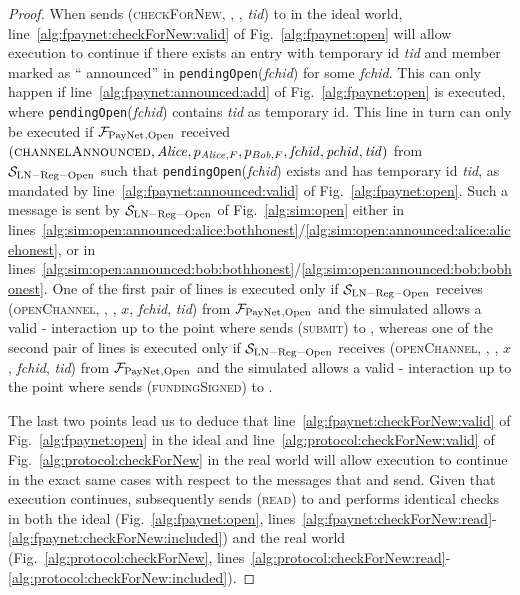 \begin{proof}
  When \environment{} sends (\textsc{checkForNew}, \alice, \bob, \textit{tid}) to
  \alice{} in the ideal world, line~\ref{alg:fpaynet:checkForNew:valid} of
  Fig.~\ref{alg:fpaynet:open} will allow execution to continue if there exists
  an entry with temporary id \textit{tid} and member \alice{} marked as
  ``\alice{} announced'' in \texttt{pendingOpen}(\textit{fchid}) for some
  \textit{fchid}. This can only happen if line~\ref{alg:fpaynet:announced:add}
  of Fig.~\ref{alg:fpaynet:open} is executed, where
  \texttt{pendingOpen}(\textit{fchid}) contains \textit{tid} as temporary id.
  This line in turn can only be executed if $\mathcal{F}_{\mathrm{PayNet}}{}_{\mathrm{, Open}}$
  received $\left(\textsc{channelAnnounced}, \mathit{Alice}, p_{\mathit{Alice}, F}, p_{\mathit{Bob},
  F}, \mathit{fchid}, \mathit{pchid}, \mathit{tid}\right)$ from
  $\mathcal{S}_{\mathrm{LN - Reg - Open}}$ such that
  \texttt{pendingOpen}(\textit{fchid}) exists and has temporary id
  \textit{tid}, as mandated by line~\ref{alg:fpaynet:announced:valid} of
  Fig.~\ref{alg:fpaynet:open}. Such a message is sent by
  $\mathcal{S}_{\mathrm{LN - Reg - Open}}$ of Fig.~\ref{alg:sim:open} either in
  lines~\ref{alg:sim:open:announced:alice:bothhonest}/\ref{alg:sim:open:announced:alice:alicehonest},
  or in
  lines~\ref{alg:sim:open:announced:bob:bothhonest}/\ref{alg:sim:open:announced:bob:bobhonest}.
  One of the first pair of lines is executed only if $\mathcal{S}_{\mathrm{LN -
  Reg - Open}}$ receives (\textsc{openChannel}, \alice, \bob, $x$,
  \textit{fchid}, \textit{tid}) from $\mathcal{F}_{\mathrm{PayNet}}{}_{\mathrm{, Open}}$ and the
  simulated \adversary{} allows a valid \alice-\bob{} interaction up to the
  point where \alice{} sends (\textsc{submit}) to \ledger, whereas one of the
  second pair of lines is executed only if $\mathcal{S}_{\mathrm{LN - Reg -
  Open}}$ receives (\textsc{openChannel}, \bob, \alice, $x$, \textit{fchid},
  \textit{tid}) from $\mathcal{F}_{\mathrm{PayNet}}{}_{\mathrm{, Open}}$ and the simulated
  \adversary{} allows a valid \alice-\bob{} interaction up to the point where
  \alice{} sends (\textsc{fundingSigned}) to \bob.

  The last two points lead us to deduce that
  line~\ref{alg:fpaynet:checkForNew:valid} of Fig.~\ref{alg:fpaynet:open} in the
  ideal and line~\ref{alg:protocol:checkForNew:valid} of
  Fig.~\ref{alg:protocol:checkForNew} in the real world will allow execution to
  continue in the exact same cases with respect to the messages that
  \environment{} and \adversary{} send. Given that execution continues,
  \alice{} subsequently sends (\textsc{read}) to \ledger{} and performs
  identical checks in both the ideal (Fig.~\ref{alg:fpaynet:open},
  lines~\ref{alg:fpaynet:checkForNew:read}-\ref{alg:fpaynet:checkForNew:included})
  and the real world (Fig.~\ref{alg:protocol:checkForNew},
  lines~\ref{alg:protocol:checkForNew:read}-\ref{alg:protocol:checkForNew:included}).


\end{proof}
